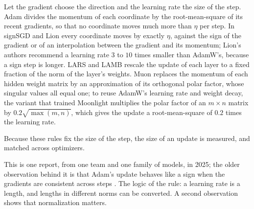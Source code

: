 \begin{refsection}
\begin{practice}
Let the gradient choose the direction and the learning rate the size of the step. Adam divides the momentum of each coordinate by the root-mean-square of its recent gradients, so that no coordinate moves much more than $\eta$ per step. In signSGD and Lion every coordinate moves by exactly $\eta$, against the sign of the gradient or of an interpolation between the gradient and its momentum; Lion's authors recommend a learning rate $3$ to $10$ times smaller than AdamW's, because a sign step is longer. LARS and LAMB rescale the update of each layer to a fixed fraction of the norm of the layer's weights. Muon replaces the momentum of each hidden weight matrix by an approximation of its orthogonal polar factor, whose singular values all equal one; to reuse AdamW's learning rate and weight decay, the variant that trained Moonlight multiplies the polar factor of an $m\times n$ matrix by $0.2\sqrt{\max(m,n)}$, which gives the update a root-mean-square of $0.2$ times the learning rate.
\end{practice}

Because these rules fix the size of the step, the size of an update is measured, and matched across optimizers.


This is one report, from one team and one family of models, in 2025; the older observation behind it is that Adam's update behaves like a sign when the gradients are consistent across steps \parencite{BallesHennig2018}. The logic of the rule: a learning rate is a length, and lengths in different norms can be converted. A second observation shows that normalization matters.



\end{refsection}
